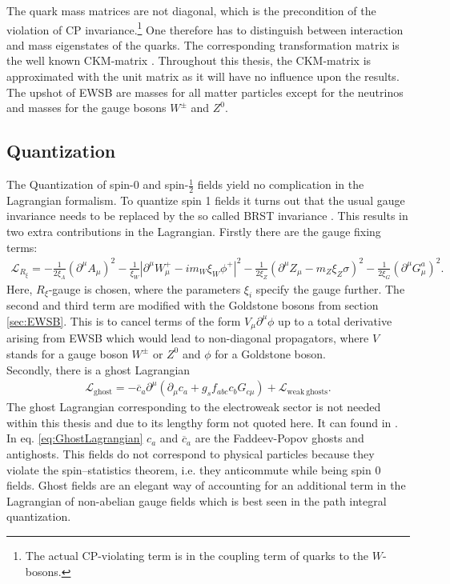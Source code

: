 The quark mass matrices are not diagonal, which is the precondition of the violation of CP invariance.\footnote{The actual CP-violating term is in the coupling term of quarks to the $W$-bosons.} One therefore has to distinguish between interaction and mass eigenstates of the quarks. The corresponding transformation matrix is the well known CKM-matrix \cite{Cabbibo:1964zsa, Kobayashi:1973fv}. Throughout this thesis, the CKM-matrix is approximated with the unit matrix as it will have no influence upon the results.\\
The upshot of EWSB are masses for all matter particles except for the neutrinos and masses for the gauge bosons $W^\pm$ and $Z^0$.

\subsection{Quantization}
The Quantization of spin-0 and spin-$\frac{1}{2}$ fields yield no complication in the Lagrangian formalism. To quantize spin 1 fields it turns out that the usual gauge invariance needs to be replaced by the so called BRST invariance \cite{Becchi:1974xu, Becchi:1974md, Becchi:1975nq}. This results in two extra contributions in the Lagrangian. Firstly there are the gauge fixing terms:
\begin{align}
\mathcal{L}_{R_\xi} = -\frac{1}{2\xi_A} (\partial^\mu A_\mu)^2  - \frac{1}{\xi_W} |\partial^\mu W_\mu^+ - im_W \xi_W \phi^+|^2 - \frac{1}{2\xi_Z} (\partial^\mu Z_\mu - m_Z \xi_Z \sigma)^2 - \frac{1}{2\xi_G}(\partial^\mu G_\mu^a)^2.
\end{align}
Here, $R_\xi$-gauge is chosen, where the parameters $\xi_i$ specify the gauge further. The second and third term are modified with the Goldstone bosons from section \ref{sec:EWSB}. This is to cancel terms of the form $V_\mu \partial^\mu \phi$ up to a total derivative arising from EWSB which would lead to non-diagonal propagators, where $V$ stands for a gauge boson $W^\pm$ or $Z^0$ and $\phi$ for a Goldstone boson.\\%
Secondly, there is a ghost Lagrangian
\begin{align}
\mathcal{L}_{\mathrm{ghost}} = -\overline{c}_a \partial^\mu \left( \partial_\mu c_a + g_s f_{abc} c_b G_{c \mu} \right) + \mathcal{L}_{\mathrm{weak\ ghosts}}.\label{eq:GhostLagrangian}
\end{align}
The ghost Lagrangian corresponding to the electroweak sector is not needed within this thesis and due to its lengthy form not quoted here. It can found in \cite{book:811554}. %
In eq. \eqref{eq:GhostLagrangian} $c_a$ and $\overline{c}_a$ are the Faddeev-Popov ghosts and antighosts. This fields do not correspond to physical particles because they violate the spin–statistics theorem, i.e. they anticommute while being spin 0 fields. Ghost fields are an elegant way of accounting for an additional term in the Lagrangian of non-abelian gauge fields which is best seen in the path integral quantization\cite{Peskin}.

